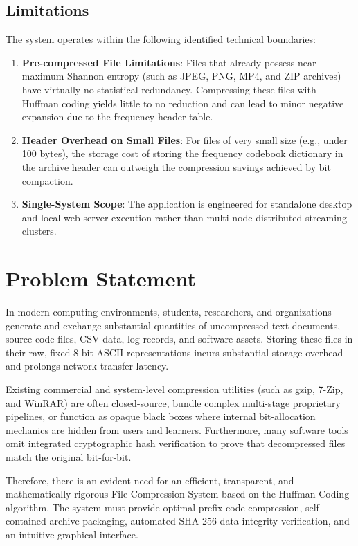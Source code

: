 \documentclass[12pt,a4paper]{article}
\begin{document}
\subsection{Limitations}
The system operates within the following identified technical boundaries:
\begin{enumerate}
    \item \textbf{Pre-compressed File Limitations}: Files that already possess near-maximum Shannon entropy (such as JPEG, PNG, MP4, and ZIP archives) have virtually no statistical redundancy. Compressing these files with Huffman coding yields little to no reduction and can lead to minor negative expansion due to the frequency header table.
    \item \textbf{Header Overhead on Small Files}: For files of very small size (e.g., under 100 bytes), the storage cost of storing the frequency codebook dictionary in the archive header can outweigh the compression savings achieved by bit compaction.
    \item \textbf{Single-System Scope}: The application is engineered for standalone desktop and local web server execution rather than multi-node distributed streaming clusters.
\end{enumerate}

\section{Problem Statement}

In modern computing environments, students, researchers, and organizations generate and exchange substantial quantities of uncompressed text documents, source code files, CSV data, log records, and software assets. Storing these files in their raw, fixed 8-bit ASCII representations incurs substantial storage overhead and prolongs network transfer latency.

Existing commercial and system-level compression utilities (such as gzip, 7-Zip, and WinRAR) are often closed-source, bundle complex multi-stage proprietary pipelines, or function as opaque black boxes where internal bit-allocation mechanics are hidden from users and learners. Furthermore, many software tools omit integrated cryptographic hash verification to prove that decompressed files match the original bit-for-bit.

Therefore, there is an evident need for an efficient, transparent, and mathematically rigorous File Compression System based on the Huffman Coding algorithm. The system must provide optimal prefix code compression, self-contained archive packaging, automated SHA-256 data integrity verification, and an intuitive graphical interface.
\end{document}
